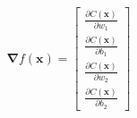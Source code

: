 \documentclass[preview]{standalone}
\begin{document}
\begin{align*}
\mathbf{\nabla} f(\mathbf{x}) = \begin{bmatrix} \frac{\partial C(\mathbf{x})}{\partial w_1} \\ \frac{\partial C(\mathbf{x})}{\partial b_1} \\ \frac{\partial C(\mathbf{x})}{\partial w_2} \\ \frac{\partial C(\mathbf{x})}{\partial b_2} \end{bmatrix}
\end{align*}
\end{document}
